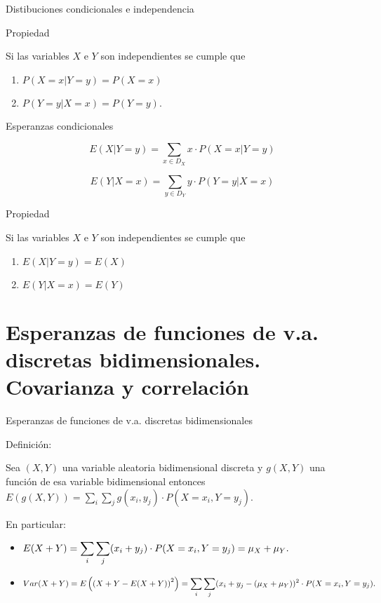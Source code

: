 \documentclass[ignorenonframetext,]{beamer}
\providecommand{\tightlist}{%
  \setlength{\itemsep}{0pt}\setlength{\parskip}{0pt}}
\begin{document}
\begin{frame}{Distibuciones condicionales e independencia}
\protect\hypertarget{distibuciones-condicionales-e-independencia}{}

 Propiedad

Si las variables \(X\) e \(Y\) son independientes se cumple que

\begin{enumerate}
\tightlist
\item
  \(P(X=x|Y=y)=P(X=x)\)
\item
  \(P(Y=y|X=x)=P(Y=y)\).
\end{enumerate}

\end{frame}

\begin{frame}{Esperanzas condicionales}
\protect\hypertarget{esperanzas-condicionales}{}

\[E(X|Y=y)=\sum_{x\in D_X} x\cdot P(X=x|Y=y)\]

\[E(Y|X=x)=\sum_{y\in D_Y} y\cdot P(Y=y|X=x)\]

 Propiedad

Si las variables \(X\) e \(Y\) son independientes se cumple que

\begin{enumerate}
\tightlist
\item
  \(E(X|Y=y)=E(X)\)
\item
  \(E(Y|X=x)=E(Y)\)
\end{enumerate}

\end{frame}

\hypertarget{esperanzas-de-funciones-de-v.a.-discretas-bidimensionales.-covarianza-y-correlaciuxf3n}{%
\section{Esperanzas de funciones de v.a. discretas bidimensionales.
Covarianza y
correlación}\label{esperanzas-de-funciones-de-v.a.-discretas-bidimensionales.-covarianza-y-correlaciuxf3n}}

\begin{frame}{Esperanzas de funciones de v.a. discretas bidimensionales}
\protect\hypertarget{esperanzas-de-funciones-de-v.a.-discretas-bidimensionales}{}

 Definición:

Sea \((X,Y)\) una variable aleatoria bidimensional discreta y \(g(X,Y)\)
una función de esa variable bidimensional entonces
\(E(g(X,Y))=\sum_i\sum_j g(x_i,y_j) \cdot P(X=x_i,Y=y_j)\).

En particular:

\begin{itemize}
\tightlist
\item
  \(\scriptsize{\displaystyle E(X+Y)=\sum_i\sum_j (x_i+y_j) \cdot P(X=x_i,Y=y_j)}=\mu_X+\mu_Y.\)
\item
  \(\scriptsize{\displaystyle Var(X+Y)=E\left(\left(X+Y-E(X+Y)\right)^2\right)=\sum_i\sum_j (x_i+y_j-(\mu_X+\mu_Y))^2\cdot P(X=x_i,Y=y_j).}\)
\end{itemize}

\end{frame}
\end{document}
